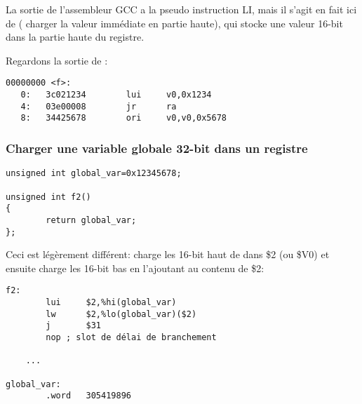 La sortie de l'assembleur GCC a la pseudo instruction LI, mais il s'agit en fait
ici de  ( charger la valeur immédiate en partie
haute), qui stocke une valeur 16-bit dans la partie haute du registre.

Regardons la sortie de :

\begin{lstlisting}[caption=objdump,style=customasmMIPS]
00000000 <f>:
   0:   3c021234        lui     v0,0x1234
   4:   03e00008        jr      ra
   8:   34425678        ori     v0,v0,0x5678
\end{lstlisting}

\subsubsection{Charger une variable globale 32-bit dans un registre}

\begin{lstlisting}[style=customc]
unsigned int global_var=0x12345678;

unsigned int f2()
{
        return global_var;
};
\end{lstlisting}


Ceci est légèrement différent:  charge les 16-bit haut de 
dans \$2 (ou \$V0) et ensuite  charge les 16-bit bas en l'ajoutant au contenu
de \$2:

\begin{lstlisting}[caption=GCC 4.4.5 -O3 (\assemblyOutput),style=customasmMIPS]
f2:
        lui     $2,%hi(global_var)
        lw      $2,%lo(global_var)($2)
        j       $31
        nop	; slot de délai de branchement

	...

global_var:
        .word   305419896
\end{lstlisting}

